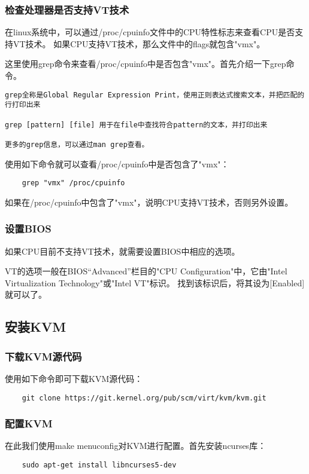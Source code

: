 \documentclass[a4paper,left=2.5cm,right=2.5cm,11pt]{article}
\begin{document}
\subsubsection{检查处理器是否支持VT技术}
	在linux系统中，可以通过/proc/cpuinfo文件中的CPU特性标志来查看CPU是否支持VT技术。
	如果CPU支持VT技术，那么文件中的flags就包含"vmx"。\par
	这里使用grep命令来查看/proc/cpuinfo中是否包含"vmx"。首先介绍一下grep命令。
	\begin{lstlisting}[numberstyle=\color{white}]
grep全称是Global Regular Expression Print，使用正则表达式搜索文本，并把匹配的行打印出来

grep [pattern] [file] 用于在file中查找符合pattern的文本，并打印出来

更多的grep信息，可以通过man grep查看。
	\end{lstlisting}

	使用如下命令就可以查看/proc/cpuinfo中是否包含了"vmx"：
	\begin{lstlisting}
	grep "vmx" /proc/cpuinfo
	\end{lstlisting}

	如果在/proc/cpuinfo中包含了"vmx"，说明CPU支持VT技术，否则另外设置。

\subsubsection{设置BIOS}
	如果CPU目前不支持VT技术，就需要设置BIOS中相应的选项。\par
	VT的选项一般在BIOS“Advanced”栏目的"CPU Configuration"中，它由"Intel Virtualization Technology"或"Intel VT"标识。
	找到该标识后，将其设为[Enabled]就可以了。

\subsection{安装KVM}
\subsubsection{下载KVM源代码}
	使用如下命令即可下载KVM源代码：
	\begin{lstlisting}
	git clone https://git.kernel.org/pub/scm/virt/kvm/kvm.git
	\end{lstlisting}

\subsubsection{配置KVM}
	在此我们使用make menuconfig对KVM进行配置。首先安装ncurses库：
	\begin{lstlisting}
	sudo apt-get install libncurses5-dev
	\end{lstlisting}
\end{document}
